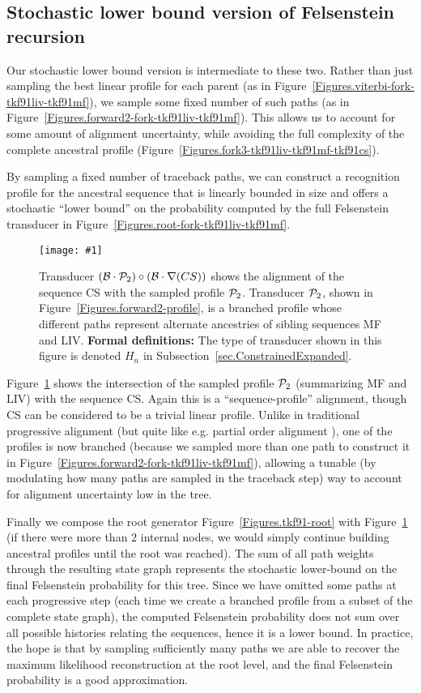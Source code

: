 \documentclass{article}
\newcommand{\secref}[1]{Subsection~\ref{sec.#1}}
\newcommand{\figref}[1]{Figure~\ref{Figures.#1}}
\newcommand{\figlabel}[1]{\label{Figures.#1}}
\newcommand{\easyfig}[4]{
\begin{figure}
\texttt{[image: \#1]}
\caption{ \figlabel{#3} #4}
\end{figure}}
\newcommand{\widepngfig}[2]{\easyfig{#1.png}{width=\textwidth}{#1}{#2}}
\newcommand{\needfig}[1]{{\bf Need figure: } #1 }
\newcommand\tkf{{\cal B}}
\newcommand\profile{{\cal P}}
\newcommand\formaldefs{{\bf Formal definitions: }}
\newcommand\fork{\circ}
\newcommand\recognize{\nabla}
\begin{document}
\subsection{Stochastic lower bound version of Felsenstein recursion}

Our stochastic lower bound version is intermediate to these two.
Rather than just sampling the best linear profile for each parent
(as in \figref{viterbi-fork-tkf91liv-tkf91mf}),
we sample some fixed number of such paths
(as in \figref{forward2-fork-tkf91liv-tkf91mf}).
This allows us to account for some amount of alignment uncertainty,
while avoiding the full complexity of the complete ancestral profile
(\figref{fork3-tkf91liv-tkf91mf-tkf91cs}).

By sampling a fixed number of traceback paths,
we can construct a recognition profile for the ancestral sequence
that is linearly bounded in size and offers a stochastic ``lower bound''
on the probability computed by the full Felsenstein transducer in \figref{root-fork-tkf91liv-tkf91mf}.

\widepngfig{fork-tkf91forward2-tkf91cs}{Transducer $(\tkf \cdot \profile_2)\fork(\tkf \cdot \recognize(CS))$ shows the alignment of the sequence CS with the sampled profile $\profile_2$.
Transducer $\profile_2$, shown in \figref{forward2-profile}, is a branched profile whose different paths represent alternate ancestries of sibling sequences MF and LIV.
\formaldefs
The type of transducer shown in this figure is denoted $H_n$ in \secref{ConstrainedExpanded}.
}

\figref{fork-tkf91forward2-tkf91cs} shows the intersection of the sampled profile $\profile_2$ (summarizing MF and LIV) with the sequence CS.  
 Again this is a ``sequence-profile'' alignment, though CS can be considered to be a 
trivial linear profile.  
Unlike in traditional progressive alignment
 (but quite like e.g. partial order alignment \cite{LeeGrassoSharlow2002}),
one of the profiles is now branched
 (because we sampled more than one path to construct it in \figref{forward2-fork-tkf91liv-tkf91mf}), allowing a tunable (by modulating how many paths are sampled in the traceback step)
way to account for alignment uncertainty low in the tree.  


Finally we compose the root generator \figref{tkf91-root}
with \figref{fork-tkf91forward2-tkf91cs} (if there were more than 2 internal nodes,
we would simply continue building ancestral profiles until the root was reached).
The sum of all path weights through the resulting state graph
 represents the stochastic lower-bound
on the final Felsenstein probability for this tree.
Since we have omitted some paths at each progressive step
 (each time we create a branched profile from a subset of the complete state graph),
the computed Felsenstein probability does not sum over all possible histories
relating the sequences, hence it is a lower bound.  
In practice, the hope is that by sampling sufficiently many paths we are able to 
recover the maximum likelihood reconstruction at the root level, and the
final Felsenstein probability is a good approximation. 
\end{document}
